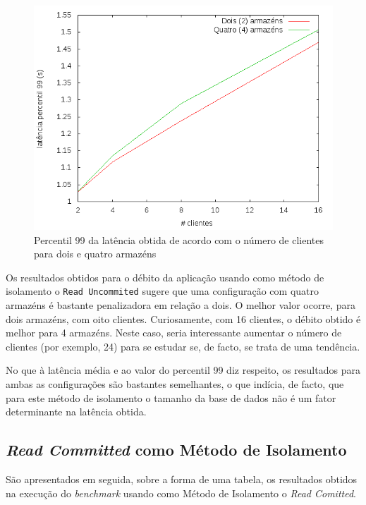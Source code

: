 
\begin{figure}[!h]
\centering
\includegraphics[scale=.4]{img/questao-1/read-uncom-lat-pct99}
\caption{Percentil 99 da latência obtida de acordo com o número de clientes para dois e quatro armazéns}
\end{figure}

Os resultados obtidos para o débito da aplicação usando como método de isolamento o \verb+Read Uncommited+ sugere que uma configuração com quatro armazéns é bastante penalizadora em relação a dois.
O melhor valor ocorre, para dois armazéns, com oito clientes.
Curiosamente, com 16 clientes, o débito obtido é melhor para 4 armazéns.
Neste caso, seria interessante aumentar o número de clientes (por exemplo, 24) para se estudar se, de facto, se trata de uma tendência.

No que à latência média e ao valor do percentil 99 diz respeito, os resultados para ambas as configurações são bastantes semelhantes, o que indícia, de facto, que para este método de isolamento o tamanho da base de dados não é um fator determinante na latência obtida.

\newpage

\subsection{\textit{Read Committed} como Método de Isolamento}

São apresentados em seguida, sobre a forma de uma tabela, os resultados obtidos na execução do \textit{benchmark} usando como Método de Isolamento o \textit{Read Comitted}.

